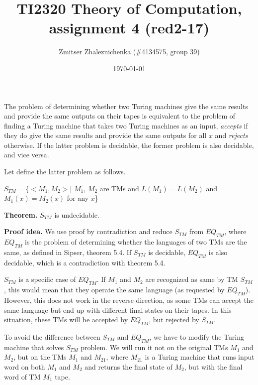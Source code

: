 \documentclass[a4paper, notitlepage]{article}
\begin{document}
\makeatletter
\renewcommand\paragraph{\@startsection{paragraph}{4}{\z@}%
  {-3.25ex\@plus -1ex \@minus -.2ex}%
  {1.5ex \@plus .2ex}%
  {\normalfont\normalsize\bfseries}}
\makeatother

\title{TI2320 Theory of Computation, assignment 4 (red2-17)} 
\author{Zmitser Zhaleznichenka (\#4134575, group 39)}
\date{\today}
\maketitle

\setcounter{secnumdepth}{0}

The problem of determining whether two Turing machines give the same results and provide the same outputs on their tapes is equivalent to the problem of finding a Turing machine that takes two Turing machines as an input, \emph{accepts} if they do give the same results and provide the same outputs for all $x$ and \emph{rejects} otherwise. If the latter problem is decidable, the former problem is also decidable, and vice versa.

Let define the latter problem as follows. 

\begin{center} 
$S_{TM} = \{<M_1, M_2> |$ $M_1$, $M_2$ are TMs and $L(M_1) = L(M_2)$ and $M_1(x) = M_2(x)$ for any $x$\}
\end{center}

\textbf{Theorem.} $S_{TM}$ is undecidable.\newline

\textbf{Proof idea.} We use proof by contradiction and reduce $S_{TM}$ from $EQ_{TM}$, where $EQ_{TM}$ is the problem of determining whether the languages of two TMs are the same, as defined in Sipser, theorem 5.4. If $S_{TM}$ is decidable, $EQ_{TM}$ is also decidable, which is a contradiction with theorem 5.4. 

$S_{TM}$ is a specific case of $EQ_{TM}$. If $M_1$ and $M_2$ are recognized as same by TM $S_{TM}$, this would mean that they operate the same language (as requested by $EQ_{TM}$). However, this does not work in the reverse direction, as some TMs can accept the same language but end up with different final states on their tapes. In this situation, these TMs will be accepted by $EQ_{TM}$, but rejected by $S_{TM}$. 

To avoid the difference between $S_{TM}$ and $EQ_{TM}$, we have to modify the Turing machine that  solves $S_{TM}$ problem. We will run it not on the original TMs $M_1$ and $M_2$, but on the TMs $M_1$ and $M_{21}$, where $M_{21}$ is a Turing machine that runs input word on both $M_1$ and $M_2$ and returns the final state of $M_2$, but with the final word of TM $M_1$ tape.\newline
\end{document}

